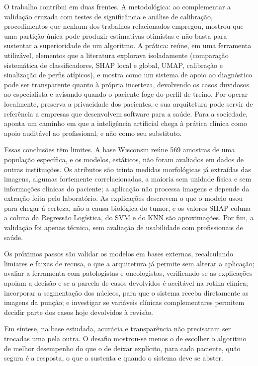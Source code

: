 \documentclass[
    12pt
    ,oneside
    ,a4paper
    ,chapter=TITLE
    ,section=TITLE
    ,sumario=abnt-6027-2012
    ,english,brazil]{abntex2} %
\begin{document}
O trabalho contribui em duas frentes. A metodológica: ao complementar a validação cruzada com testes de significância e análise de calibração, procedimentos que nenhum dos trabalhos relacionados empregou, mostrou que uma partição única pode produzir estimativas otimistas e não basta para sustentar a superioridade de um algoritmo. A prática: reúne, em uma ferramenta utilizável, elementos que a literatura explorava isoladamente (comparação sistemática de classificadores, SHAP local e global, UMAP, calibração e sinalização de perfis atípicos), e mostra como um sistema de apoio ao diagnóstico pode ser transparente quanto à própria incerteza, devolvendo os casos duvidosos ao especialista e avisando quando o paciente foge do perfil de treino. Por operar localmente, preserva a privacidade dos pacientes, e sua arquitetura pode servir de referência a empresas que desenvolvem software para a saúde. Para a sociedade, aponta um caminho em que a inteligência artificial chega à prática clínica como apoio auditável ao profissional, e não como seu substituto.

Essas conclusões têm limites. A base Wisconsin reúne 569 amostras de uma população específica, e os modelos, estáticos, não foram avaliados em dados de outras instituições. Os atributos são trinta medidas morfológicas já extraídas das imagens, algumas fortemente correlacionadas, a maioria sem unidade física e sem informações clínicas do paciente; a aplicação não processa imagens e depende da extração feita pelo laboratório. As explicações descrevem o que o modelo usou para chegar à certeza, não a causa biológica do tumor, e os valores SHAP coluna a coluna da Regressão Logística, do SVM e do KNN são aproximações. Por fim, a validação foi apenas técnica, sem avaliação de usabilidade com profissionais de saúde.

Os próximos passos são validar os modelos em bases externas, recalculando limiares e faixas de recusa, o que a arquitetura já permite sem alterar a aplicação; avaliar a ferramenta com patologistas e oncologistas, verificando se as explicações apoiam a decisão e se a parcela de casos devolvidos é aceitável na rotina clínica; incorporar a segmentação dos núcleos, para que o sistema receba diretamente as imagens da punção; e investigar se variáveis clínicas complementares permitem decidir parte dos casos hoje devolvidos à revisão.

Em síntese, na base estudada, acurácia e transparência não precisaram ser trocadas uma pela outra. O desafio mostrou-se menos o de escolher o algoritmo de melhor desempenho do que o de deixar explícito, para cada paciente, quão segura é a resposta, o que a sustenta e quando o sistema deve se abster.
\end{document}
